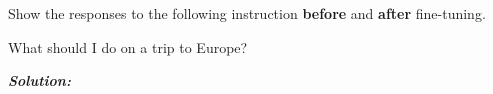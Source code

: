 \documentclass[addpoints,12pt]{exam}
\begin{document}
\begin{questions}
\begin{parts}
    Show the responses to the following instruction \textbf{before} and \textbf{after} fine-tuning.
    

    \begin{center}
        What should I do on a trip to Europe?
    \end{center}
    
    \textbf{\textit{{\color{coral} Solution:}}}
\end{parts}

\end{questions}
\end{document}
